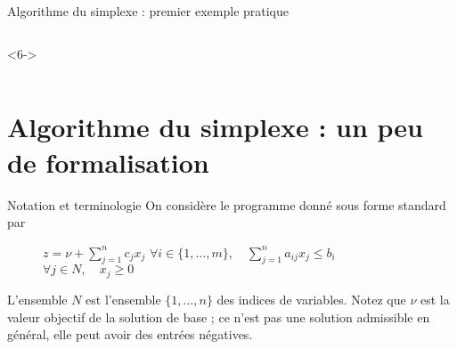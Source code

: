 \documentclass[aspectratio = 169]{beamer}
\begin{document}
\begin{frame}{Algorithme du simplexe : premier exemple pratique}
\begin{columns}
\begin{column}{.5\textwidth}
\begin{overlayarea}{\textwidth}{.8\textheight}
\begin{onlyenv}
                \end{onlyenv}
                \begin{onlyenv}<6->
                    \begin{figure}
                    \end{figure}
                \end{onlyenv}
            \end{overlayarea}
        \end{column}
    \end{columns}
\end{frame}

\section{Algorithme du simplexe : un peu de formalisation}

\begin{frame}{Notation et terminologie}
  On considère le programme donné sous forme standard par
  \begin{figure}
    \begin{linearProgG}{
        ${\displaystyle z = \nu + \sum_{j=1}^n c_jx_j}$
      }{
        ${\displaystyle \forall i \in \{ 1, \ldots, m \}, \quad \sum_{j=1}^n a_{ij}x_j \leq b_i}$
      }{
        $\forall j \in N, \quad x_j \geq 0$
      }
    \end{linearProgG}
  \end{figure}
  L'ensemble $N$ est l'ensemble $\{ 1, \ldots, n \}$ des indices de
  variables. Notez que $\nu$ est la valeur objectif de la solution de
  base ; ce n'est pas une solution admissible en général, elle peut
  avoir des entrées négatives.
\end{frame}
\end{document}
